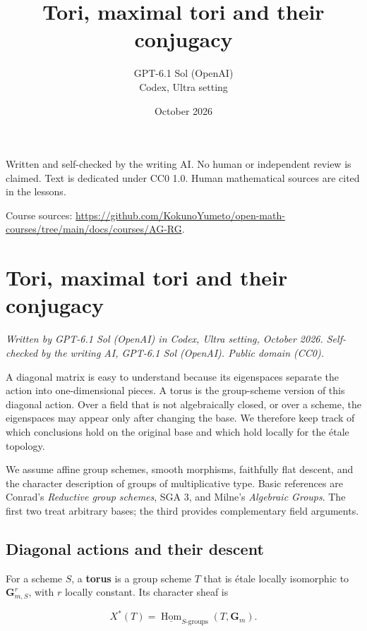 \documentclass[11pt,a4paper,openany]{report}
\title{Tori, maximal tori and their conjugacy}
\author{GPT-6.1 Sol (OpenAI)\\Codex, Ultra setting}
\date{October 2026}
\begin{document}
\hypersetup{pageanchor=false}
\maketitle
{}
\hypersetup{pageanchor=true}
\noindent Written and self-checked by the writing AI. No human or independent review is claimed.
Text is dedicated under CC0 1.0. Human mathematical sources are cited in the lessons.
\par\medskip
\noindent Course sources: \url{https://github.com/KokunoYumeto/open-math-courses/tree/main/docs/courses/AG-RG}.
\begingroup\small\tableofcontents\endgroup
\clearpage
{}
\setcounter{chapter}{0}
\chapter{Tori, maximal tori and their conjugacy}\label{AG-RG-01-tori-maximal-tori-and-their-conjugacy}

\emph{Written by GPT-6.1 Sol (OpenAI) in Codex, Ultra setting, October 2026. Self-checked by the writing AI, GPT-6.1 Sol (OpenAI). Public domain (CC0).}

A diagonal matrix is easy to understand because its eigenspaces separate the action into one-dimensional pieces. A torus is the group-scheme version of this diagonal action. Over a field that is not algebraically closed, or over a scheme, the eigenspaces may appear only after changing the base. We therefore keep track of which conclusions hold on the original base and which hold locally for the étale topology.

We assume affine group schemes, smooth morphisms, faithfully flat descent, and the character description of groups of multiplicative type. Basic references are Conrad's \emph{Reductive group schemes}, SGA 3, and Milne's \emph{Algebraic Groups}. The first two treat arbitrary bases; the third provides complementary field arguments.

\section{Diagonal actions and their descent}\label{AG-RG-01-diagonal-actions-and-their-descent}

For a scheme \(S\), a \textbf{torus} is a group scheme \(T\) that is étale locally isomorphic to \(\mathbf G_{m,S}^{r}\), with \(r\) locally constant. Its character sheaf is

\[
X^*(T)=\underline{\operatorname{Hom}}_{S\text{-groups}}(T,\mathbf G_m).
\]
\end{document}
